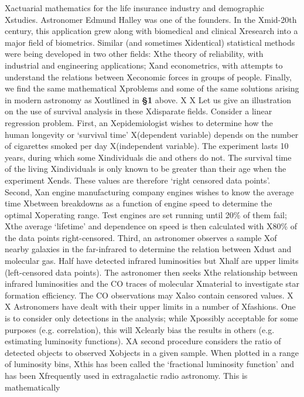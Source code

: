 Xactuarial mathematics for the life insurance industry and demographic 
Xstudies.  Astronomer Edmund Halley was one of the founders. In the
Xmid-20th century, this application grew along with biomedical and clinical
Xresearch into a major field of biometrics. Similar (and sometimes 
Xidentical) statistical methods were  being developed in two other fields:
Xthe theory of reliability, with industrial and engineering applications; 
Xand econometrics, with attempts to understand the relations between
Xeconomic forces in groups of people. Finally, we find the same mathematical
Xproblems and some of the same solutions arising in modern astronomy as
Xoutlined in {\bf \S 1} above.
X 
X     Let us give an illustration on the use of survival analysis in these
Xdisparate fields.  Consider a linear regression problem.   First, an 
Xepidemiologist wishes to determine how the human longevity or `survival time' 
X(dependent variable) depends on the number of cigarettes smoked per day 
X(independent variable).  The experiment lasts 10 years, during which some 
Xindividuals die  and others do not. The survival time of the living 
Xindividuals is only known to be greater than their age when the experiment
Xends. These values are therefore `right censored data points'.  Second, 
Xan engine manufacturing company engines wishes to know the average time 
Xbetween breakdowns as a function of engine speed to determine the optimal
Xoperating range.  Test engines are set running until 20\% of them fail; 
Xthe average `lifetime' and dependence on speed is then calculated with 
X80\% of the data points right-censored.  Third, an astronomer observes a sample
Xof nearby galaxies in the far-infrared to determine the relation between 
Xdust and molecular gas.  Half have detected infrared luminosities  but 
Xhalf are upper limits (left-censored data points).  The astronomer then seeks
Xthe relationship between infrared luminosities and the CO traces of molecular
Xmaterial to investigate star formation efficiency.  The CO observations may 
Xalso contain censored values.
X 
X     Astronomers have dealt with their upper limits in a number of
Xfashions.  One is to consider only detections in the analysis; while
Xpossibly acceptable for some purposes (e.g. correlation),  this will 
Xclearly bias the results in others (e.g. estimating  luminosity functions).
XA second procedure considers the ratio of detected objects to observed 
Xobjects in a given sample. When plotted in a range of luminosity bins, 
Xthis has been called the `fractional luminosity function' and has been 
Xfrequently used in extragalactic radio astronomy.  This is mathematically 

